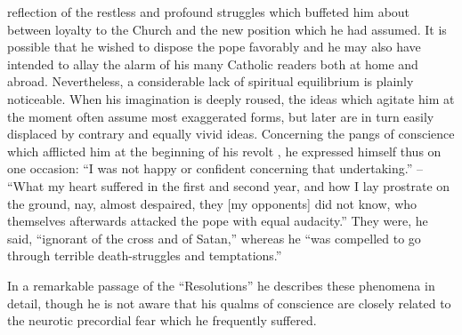 reflection of the restless and profound struggles which buffeted him
about between loyalty to the Church and the new position which
he had assumed. It is possible that he wished to dispose the pope
favorably and he may also have intended to allay the alarm of his
many Catholic readers both at home and abroad. Nevertheless, a considerable
lack of spiritual equilibrium is plainly noticeable. When
his imagination is deeply roused, the ideas which agitate him at the
moment often assume most exaggerated forms, but later are in turn
easily displaced by contrary and equally vivid ideas. Concerning the
pangs of conscience which afflicted him at the beginning of his revolt
, he expressed himself thus on one occasion: “I was not happy
or confident concerning that undertaking.” -- “What my heart suffered
in the first and second year, and how I lay prostrate on the
ground, nay, almost despaired, they [my opponents] did not know,
who themselves afterwards attacked the pope with equal audacity.”
They were, he said, “ignorant of the cross and of Satan,” whereas
he “was compelled to go through terrible death-struggles and
temptations.”

In a remarkable passage of the “Resolutions” he describes these
phenomena in detail, though he is not aware that his qualms of conscience
are closely related to the neurotic precordial fear which he
frequently suffered.

